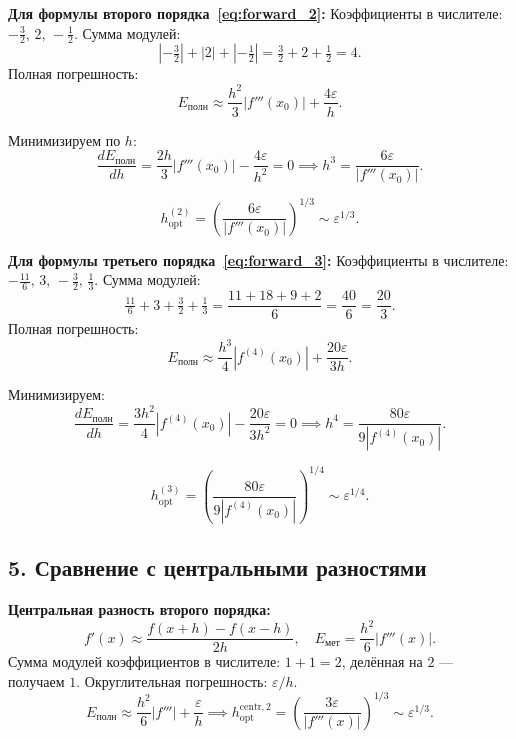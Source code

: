 \documentclass{article}
\begin{document}
\textbf{Для формулы второго порядка~\eqref{eq:forward_2}:}
Коэффициенты в числителе: $-\tfrac{3}{2},\, 2,\, -\tfrac{1}{2}$. Сумма модулей:
$$
\left|-\tfrac{3}{2}\right| + |2| + \left|-\tfrac{1}{2}\right| = \tfrac{3}{2} + 2 + \tfrac{1}{2} = 4.
$$
Полная погрешность:
\begin{equation}
E_{\text{полн}} \approx \frac{h^2}{3} |f'''(x_0)| + \frac{4\varepsilon}{h}.
\end{equation}

Минимизируем по $h$:
\begin{equation}
\frac{dE_{\text{полн}}}{dh} = \frac{2h}{3} |f'''(x_0)| - \frac{4\varepsilon}{h^2} = 0 \implies h^3 = \frac{6\varepsilon}{|f'''(x_0)|}.
\end{equation}

\begin{equation}
\boxed{h_{\text{opt}}^{(2)} = \left(\frac{6\varepsilon}{|f'''(x_0)|}\right)^{1/3} \sim \varepsilon^{1/3}.}
\end{equation}

\textbf{Для формулы третьего порядка~\eqref{eq:forward_3}:}
Коэффициенты в числителе: $-\tfrac{11}{6},\, 3,\, -\tfrac{3}{2},\, \tfrac{1}{3}$. Сумма модулей:
$$
\tfrac{11}{6} + 3 + \tfrac{3}{2} + \tfrac{1}{3} = \frac{11 + 18 + 9 + 2}{6} = \frac{40}{6} = \frac{20}{3}.
$$
Полная погрешность:
\begin{equation}
E_{\text{полн}} \approx \frac{h^3}{4} |f^{(4)}(x_0)| + \frac{20\varepsilon}{3h}.
\end{equation}

Минимизируем:
\begin{equation}
\frac{dE_{\text{полн}}}{dh} = \frac{3h^2}{4} |f^{(4)}(x_0)| - \frac{20\varepsilon}{3h^2} = 0 \implies h^4 = \frac{80\varepsilon}{9|f^{(4)}(x_0)|}.
\end{equation}

\begin{equation}
\boxed{h_{\text{opt}}^{(3)} = \left(\frac{80\varepsilon}{9|f^{(4)}(x_0)|}\right)^{1/4} \sim \varepsilon^{1/4}.}
\end{equation}

\subsection*{5. Сравнение с центральными разностями}

\textbf{Центральная разность второго порядка:}
\begin{equation}
f'(x) \approx \frac{f(x+h) - f(x-h)}{2h}, \quad E_{\text{мет}} = \frac{h^2}{6} |f'''(x)|.
\end{equation}
Сумма модулей коэффициентов в числителе: $1 + 1 = 2$, делённая на $2$ --- получаем $1$. Округлительная погрешность: $\varepsilon/h$.
\begin{equation}
E_{\text{полн}} \approx \frac{h^2}{6} |f'''| + \frac{\varepsilon}{h} \implies h_{\text{opt}}^{\text{centr},2} = \left(\frac{3\varepsilon}{|f'''(x)|}\right)^{1/3} \sim \varepsilon^{1/3}.
\end{equation}
\end{document}
